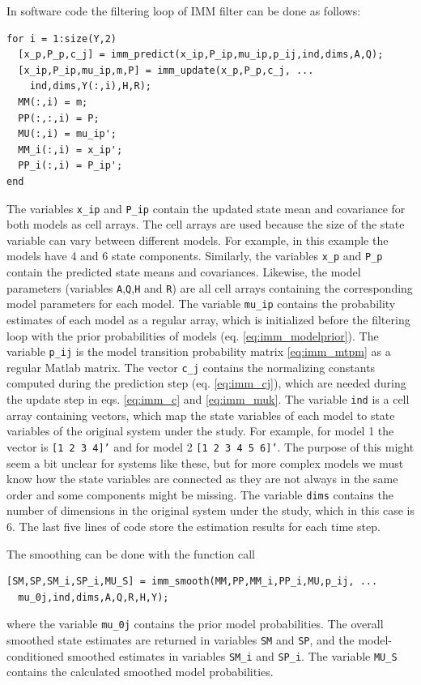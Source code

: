 In software code the filtering loop of IMM filter can be done as
follows:
%
\begin{lstlisting} 
for i = 1:size(Y,2) 
  [x_p,P_p,c_j] = imm_predict(x_ip,P_ip,mu_ip,p_ij,ind,dims,A,Q); 
  [x_ip,P_ip,mu_ip,m,P] = imm_update(x_p,P_p,c_j, ...
    ind,dims,Y(:,i),H,R); 
  MM(:,i) = m;
  PP(:,:,i) = P; 
  MU(:,i) = mu_ip'; 
  MM_i(:,i) = x_ip'; 
  PP_i(:,i) = P_ip';
end
\end{lstlisting}
%
The variables \texttt{x\_ip} and \texttt{P\_ip} contain the updated
state mean and covariance for both models as cell arrays. The cell
arrays are used because the size of the state variable can vary
between different models. For example, in this example the models have
4 and 6 state components.  Similarly, the variables \texttt{x\_p} and
\texttt{P\_p} contain the predicted state means and
covariances. Likewise, the model parameters (variables
\texttt{A},\texttt{Q},\texttt{H} and \texttt{R}) are all cell arrays
containing the corresponding model parameters for each model. The
variable \texttt{mu\_ip} contains the probability estimates of each
model as a regular array, which is initialized before the filtering
loop with the prior probabilities of models
(eq. \eqref{eq:imm_modelprior}). The variable \texttt{p\_ij} is the
model transition probability matrix \eqref{eq:imm_mtpm} as a regular
Matlab matrix. The vector \texttt{c\_j} contains the normalizing
constants computed during the prediction step (eq. \eqref{eq:imm_cj}),
which are needed during the update step in eqs. \eqref{eq:imm_c} and
\eqref{eq:imm_muk}. The variable \texttt{ind} is a cell array
containing vectors, which map the state variables of each model to
state variables of the original system under the study. For example,
for model 1 the vector is \texttt{[1 2 3 4]'} and for model 2
\texttt{[1 2 3 4 5 6]'}. The purpose of this might seem a bit unclear
for systems like these, but for more complex models we must know how
the state variables are connected as they are not always in the same
order and some components might be missing. The variable \texttt{dims}
contains the number of dimensions in the original system under the
study, which in this case is 6. The last five lines of code store the
estimation results for each time step.

The smoothing can be done with the function call
\begin{lstlisting} 
[SM,SP,SM_i,SP_i,MU_S] = imm_smooth(MM,PP,MM_i,PP_i,MU,p_ij, ...
  mu_0j,ind,dims,A,Q,R,H,Y);
\end{lstlisting} 
where the variable \texttt{mu\_0j} contains the prior
model probabilities. The overall smoothed state estimates are returned
in variables \texttt{SM} and \texttt{SP}, and the model-conditioned
smoothed estimates in variables \texttt{SM\_i} and \texttt{SP\_i}. The
variable \texttt{MU\_S} contains the calculated smoothed model
probabilities.

